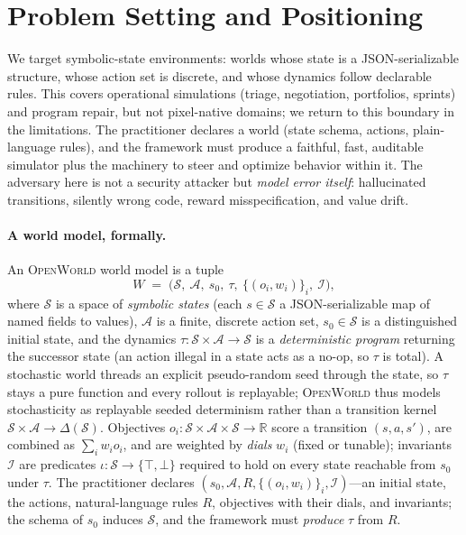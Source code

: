 \documentclass[11pt]{article}
\newcommand{\openworld}{\textsc{OpenWorld}}
\begin{document}
\section{Problem Setting and Positioning}
We target symbolic-state environments: worlds whose state is a
JSON-serializable structure, whose action set is discrete, and whose dynamics
follow declarable rules. This covers operational simulations (triage,
negotiation, portfolios, sprints) and program repair, but not pixel-native
domains; we return to this boundary in the limitations. The practitioner
declares a world (state schema, actions, plain-language rules), and the
framework must produce a faithful, fast, auditable simulator plus the
machinery to steer and optimize behavior within it. The adversary here is not
a security attacker but \emph{model error itself}: hallucinated transitions,
silently wrong code, reward misspecification, and value drift.

\paragraph{A world model, formally.} An \openworld{} world model is a tuple
\[
  W \;=\; \bigl(\mathcal{S},\ \mathcal{A},\ s_0,\ \tau,\ \{(o_i, w_i)\}_i,\ \mathcal{I}\bigr),
\]
where $\mathcal{S}$ is a space of \emph{symbolic states} (each $s \in \mathcal{S}$ a
JSON-serializable map of named fields to values), $\mathcal{A}$ is a finite,
discrete action set, $s_0 \in \mathcal{S}$ is a distinguished initial state, and
the dynamics $\tau : \mathcal{S} \times \mathcal{A} \to \mathcal{S}$ is a
\emph{deterministic program} returning the successor state (an action illegal in
a state acts as a no-op, so $\tau$ is total). A stochastic world threads an
explicit pseudo-random seed through the state, so $\tau$ stays a pure function
and every rollout is replayable; \openworld{} thus models stochasticity as
replayable seeded determinism rather than a transition kernel $\mathcal{S} \times
\mathcal{A} \to \Delta(\mathcal{S})$. Objectives $o_i : \mathcal{S} \times
\mathcal{A} \times \mathcal{S} \to \mathbb{R}$ score a transition $(s, a, s')$,
are combined as $\sum_i w_i o_i$, and are weighted by \emph{dials} $w_i$ (fixed
or tunable); invariants $\mathcal{I}$ are predicates $\iota : \mathcal{S} \to
\{\top, \bot\}$ required to hold on every state reachable from $s_0$ under $\tau$.
The practitioner declares $(s_0, \mathcal{A}, R, \{(o_i, w_i)\}_i,
\mathcal{I})$---an initial state, the actions, natural-language rules $R$,
objectives with their dials, and invariants; the schema of $s_0$ induces
$\mathcal{S}$, and the framework must \emph{produce} $\tau$ from $R$.
\end{document}
